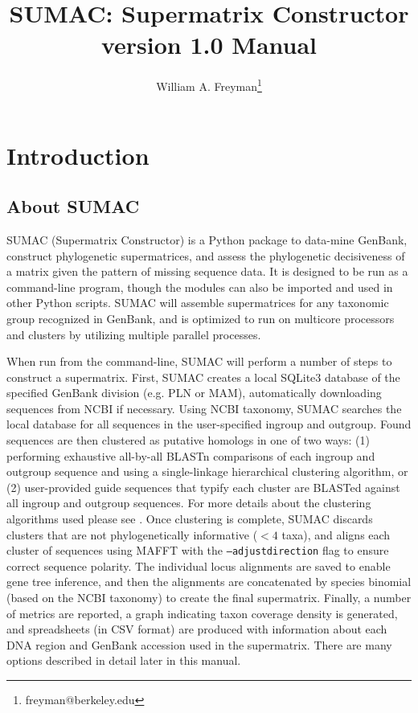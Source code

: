\documentclass[10pt]{report}
\title{SUMAC: Supermatrix Constructor version 1.0 Manual}
\author{William A. Freyman\thanks{freyman@berkeley.edu}}
\affil{Department of Integrative Biology, University of California, Berkeley}
\date{}
\begin{document}
\maketitle

\tableofcontents


\chapter{Introduction}

\section{About SUMAC}

SUMAC (Supermatrix Constructor) is a Python package to 
data-mine GenBank, construct phylogenetic supermatrices, and assess the phylogenetic decisiveness of a matrix given the pattern of missing sequence data.
It is designed to be run as a command-line program, though
the modules can also be imported and used in other Python scripts.
SUMAC will assemble
supermatrices for any taxonomic group recognized in GenBank,
and is optimized to run on multicore processors and clusters by utilizing multiple parallel processes.

When run from the command-line, SUMAC will perform a number of steps to construct
a supermatrix.
First, SUMAC creates a local SQLite3 \citep{sqlite} database of the specified GenBank division (e.g. PLN or MAM),
automatically downloading sequences from NCBI if necessary.
Using NCBI taxonomy, SUMAC searches the local database for all sequences in the user-specified ingroup
and outgroup.
Found sequences are then clustered as putative homologs in one of two ways:
(1) performing exhaustive all-by-all BLASTn \citep{blast} comparisons of each ingroup and outgroup sequence
and using a single-linkage hierarchical clustering algorithm, or
(2) user-provided guide sequences that typify each cluster are BLASTed against all ingroup and outgroup sequences.
For more details about the clustering algorithms used please see \citet{sumac}.
Once clustering is complete, SUMAC discards clusters that are not phylogenetically informative ($< 4$ taxa),
and aligns each cluster of sequences using MAFFT \citep{katoh2002mafft} with the \texttt{--adjustdirection} flag
to ensure correct sequence polarity.
The individual locus alignments are saved to enable gene tree inference,
and then the alignments are concatenated by species binomial (based on the NCBI taxonomy)
to create the final supermatrix.
Finally, a number of metrics are reported,
a graph indicating taxon coverage density is generated, and spreadsheets (in CSV format)
are produced with information about each DNA region and GenBank accession used in
the supermatrix.
There are many options described in
detail later in this manual. 
\end{document}
